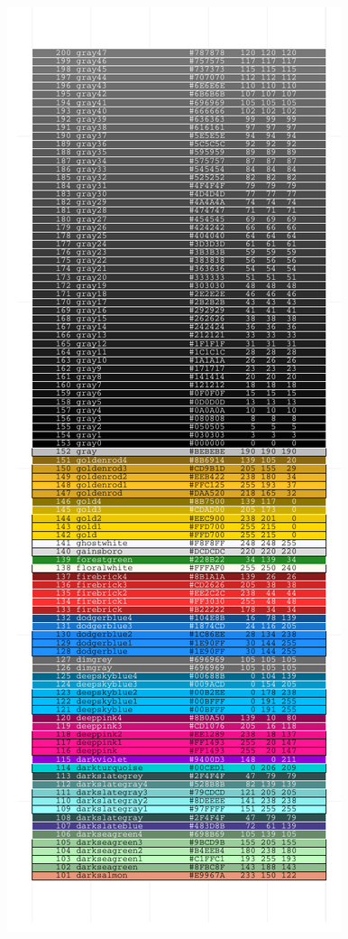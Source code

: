 \documentclass[letterpaper]{article}
\begin{document}
\begin{center}
\begin{figure}[ht]
\begin{minipage}[b]{0.5\linewidth}
\includegraphics{ggplotCheatSheet-006}
\end{minipage}
\end{figure}


\end{center}
\end{document}
